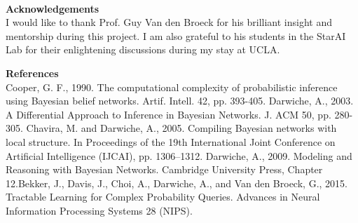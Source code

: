 \documentclass[11pt,a4paper, final, twoside]{article}
\theoremstyle{proposition}
\theoremstyle{definition}
\theoremstyle{remark}
\numberwithin{equation}{section}
\begin{document}
\mbox{}\\

\noindent \Large\textbf{Acknowledgements}\\[1mm] 
\normalsize \noindent I would like to thank Prof. Guy Van den Broeck for his brilliant insight and mentorship during this project. I am also grateful to his students in the StarAI Lab for their enlightening discussions during my stay at UCLA. \\[3mm]

\newpage

\noindent \Large\textbf{References}\\[1mm] 
\normalsize \noindent
[1] Cooper, G. F., 1990. The computational complexity of probabilistic inference using Bayesian belief networks. Artif. Intell. 42, pp. 393-405. \newline \newline
[2] Darwiche, A., 2003. A Differential Approach to Inference in Bayesian Networks. J. ACM 50, pp. 280-305. \newline \newline
[3] Chavira, M. and Darwiche, A., 2005. Compiling Bayesian networks with local structure. In Proceedings of the 19th International Joint Conference on Artificial Intelligence (IJCAI), pp. 1306–1312. \newline \newline
[4] Darwiche, A., 2009. Modeling and Reasoning with Bayesian Networks. Cambridge University Press, Chapter 12.\newline \newline
[5] Bekker, J., Davis, J., Choi, A., Darwiche, A.,  and Van den Broeck, G., 2015. Tractable Learning for Complex Probability Queries. Advances in Neural Information Processing Systems 28 (NIPS).  \newline
\end{document}
